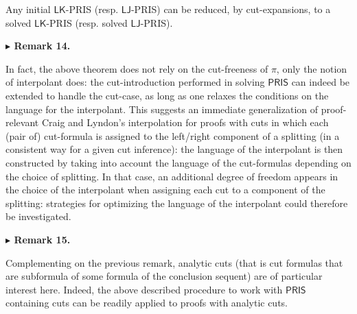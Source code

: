 \documentclass[10pt,a4paper]{article}
\begin{document}
 
Any initial $\mathsf{LK}$-PRIS (resp. $\mathsf{LJ}$-PRIS) can be reduced, by cut-expansions, to a solved $\mathsf{LK}$-PRIS (resp. solved $\mathsf{LJ}$-PRIS).\par
 
 
 
 
\par\medskip\noindent\textbf{$\blacktriangleright$ Remark 14.}\par
 
 
In fact, the above theorem does not rely on the cut-freeness of $\pi$, only the notion of interpolant does: the cut-introduction performed in solving $\mathsf{PRIS}$ can indeed be extended to handle the cut-case, as long as one relaxes the conditions on the language for the interpolant. This suggests an immediate generalization of proof-relevant Craig and Lyndon’s interpolation for proofs with cuts in which each (pair of) cut-formula is assigned to the left/right component of a splitting (in a consistent way for a given cut inference): the language of the interpolant is then constructed by taking into account the language of the cut-formulas depending on the choice of splitting. In that case, an additional degree of freedom appears in the choice of the interpolant when assigning each cut to a component of the splitting: strategies for optimizing the language of the interpolant could therefore be investigated.\par
 
 
 
 
\par\medskip\noindent\textbf{$\blacktriangleright$ Remark 15.}\par
 
 
Complementing on the previous remark, analytic cuts (that is cut formulas that are subformula of some formula of the conclusion sequent) are of particular interest here. Indeed, the above described procedure to work with $\mathsf{PRIS}$ containing cuts can be readily applied to proofs with analytic cuts.\par
 
 
\end{document}

